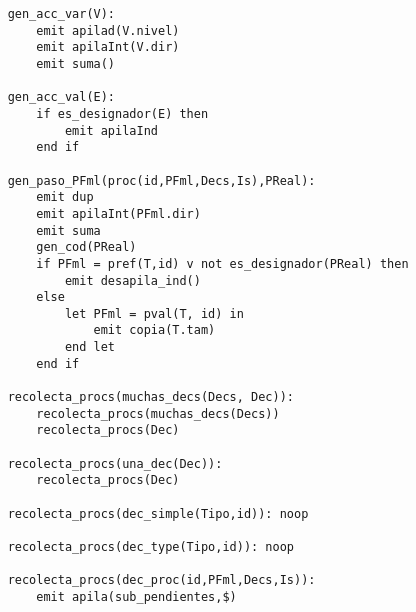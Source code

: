 \begin{lstlisting}
    gen_acc_var(V):
        emit apilad(V.nivel)
        emit apilaInt(V.dir)
        emit suma()
       
    gen_acc_val(E):
        if es_designador(E) then
            emit apilaInd
        end if
    
    gen_paso_PFml(proc(id,PFml,Decs,Is),PReal):
        emit dup
        emit apilaInt(PFml.dir)
        emit suma
        gen_cod(PReal)
        if PFml = pref(T,id) v not es_designador(PReal) then
            emit desapila_ind()
        else
            let PFml = pval(T, id) in
                emit copia(T.tam)
            end let
        end if
        
    recolecta_procs(muchas_decs(Decs, Dec)):
        recolecta_procs(muchas_decs(Decs))
        recolecta_procs(Dec)
    
    recolecta_procs(una_dec(Dec)):
        recolecta_procs(Dec)

    recolecta_procs(dec_simple(Tipo,id)): noop

    recolecta_procs(dec_type(Tipo,id)): noop

    recolecta_procs(dec_proc(id,PFml,Decs,Is)): 
        emit apila(sub_pendientes,$)

\end{lstlisting}
